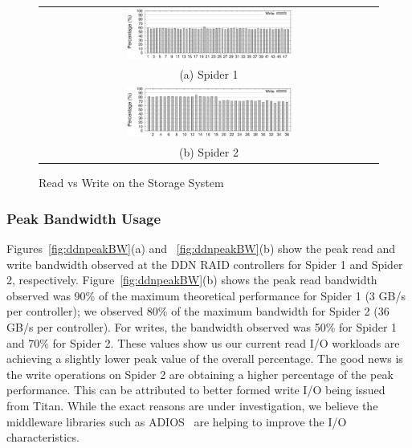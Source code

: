 \begin{figure}[!t]
\begin{center}
\begin{tabular}{c}
{\includegraphics[width=0.5\textwidth]{./figs/spider1-wr-ratio.eps}}\\
{(a) Spider 1}\\
{\includegraphics[width=0.5\textwidth]{./figs/spider2-wr-ratio.eps}}\\
{(b) Spider 2}\\
\end{tabular}
\vspace{-0.1in}
\caption{Read vs Write on the Storage System}
\label{fig:rwratio}
\end{center}
\end{figure}

\subsubsection{Peak Bandwidth Usage}

Figures~\ref{fig:ddnpeakBW}(a) and ~\ref{fig:ddnpeakBW}(b) show the
peak read and write bandwidth observed at the DDN RAID controllers for Spider 1
and Spider 2, respectively.  Figure~\ref{fig:ddnpeakBW}(b) shows the peak read
bandwidth observed was 90\% of the 
maximum theoretical performance for Spider 1 (3 GB/s per controller); we observed 80\% of the maximum bandwidth for 
Spider 2 (36 GB/s per controller). For writes, the bandwidth observed was 50\% for Spider 1 and 70\% for
Spider 2. These values show us our current read I/O workloads are achieving a 
slightly lower peak value of the overall percentage. The good news is the write
operations on Spider 2 are obtaining a higher percentage of the peak performance.
This can be
attributed to better formed write I/O being issued from Titan. While 
the exact reasons are under investigation, we believe the middleware 
libraries such as ADIOS~\cite{adios} are helping to improve the I/O characteristics. 


